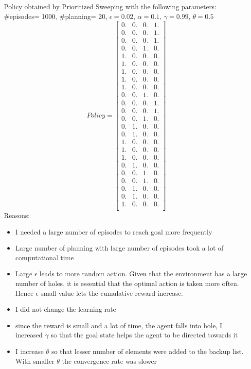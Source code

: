 \documentclass[12pt]{article}
\newenvironment{problem}[2][\large Problem]{\begin{trivlist}
\item[\hskip \labelsep {\bfseries #1}\hskip \labelsep {\bfseries #2.}]}{\end{trivlist}}
\begin{document}
\begin{problem} {3}
Policy obtained by Prioritized Sweeping with the following parameters:\\ \#episodes= 1000, \#planning= 20, $ \epsilon = 0.02$, $\alpha = 0.1$, $\gamma = 0.99 $, $\theta = 0.5$
$$ Policy = \begin{bmatrix} 
 0. & 0. & 0. & 1.\\
 0. & 0. & 0. & 1.\\
 0. & 0. & 0. & 1.\\
 0. & 0. & 1. & 0.\\
 1. & 0. & 0. & 0.\\
 1. & 0. & 0. & 0.\\
 1. & 0. & 0. & 0.\\
 1. & 0. & 0. & 0.\\
 1. & 0. & 0. & 0.\\
 0. & 0. & 1. & 0.\\
 0. & 0. & 0. & 1.\\
 0. & 0. & 0. & 1.\\
 0. & 0. & 1. & 0.\\
 0. & 1. & 0. & 0.\\
 0. & 1. & 0. & 0.\\
 1. & 0. & 0. & 0.\\
 1. & 0. & 0. & 0.\\
 1. & 0. & 0. & 0.\\
 0. & 1. & 0. & 0.\\
 0. & 0. & 1. & 0.\\
 0. & 0. & 1. & 0.\\
 0. & 1. & 0. & 0.\\
 0. & 1. & 0. & 0.\\
 1. & 0. & 0. & 0.\\
\end{bmatrix} $$ 
Reasons:
\vspace{-4mm} 
\begin{itemize}
	\item I needed a large number of episodes to reach goal more frequently
	\item Large number of planning with large number of episodes took a lot of computational time
	\item Large $\epsilon$ leads to more random action. Given that the environment has a large number of holes, it is essential that the optimal action is taken more often. Hence $\epsilon$ small value lets the cumulative reward increase.
	\item I did not change the learning rate
	\item since the reward is small and a lot of time, the agent falls into hole, I increased $\gamma$ so that the goal state helps the agent to be directed towards it
	\item I increase $\theta$ so that lesser number of elements were added to the backup list. With smaller $\theta$ the convergence rate was slower 
\end{itemize}

\end{problem}
\end{document}
